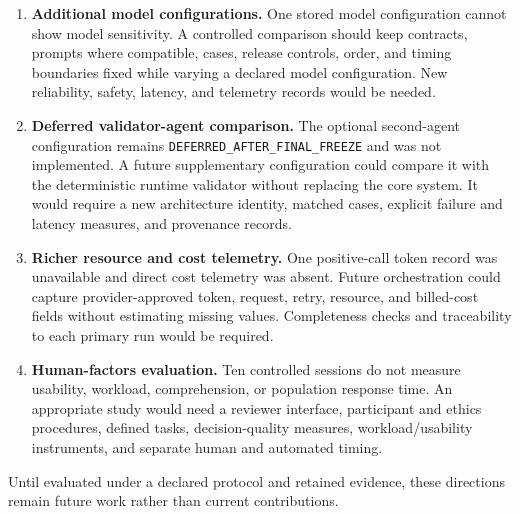 \begin{enumerate}
\item \textbf{Additional model configurations.} One stored model configuration
cannot show model sensitivity. A controlled comparison should keep contracts,
prompts where compatible, cases, release controls, order, and timing boundaries
fixed while varying a declared model configuration. New reliability, safety,
latency, and telemetry records would be needed.

\item \textbf{Deferred validator-agent comparison.} The optional second-agent
configuration remains \texttt{DEFERRED\_AFTER\_FINAL\_FREEZE} and was not
implemented. A future supplementary configuration could compare it with the
deterministic runtime validator without replacing the core system. It would
require a new architecture identity, matched cases, explicit failure and latency
measures, and provenance records.

\item \textbf{Richer resource and cost telemetry.} One positive-call token record
was unavailable and direct cost telemetry was absent. Future orchestration could
capture provider-approved token, request, retry, resource, and billed-cost fields
without estimating missing values. Completeness checks and traceability to each
primary run would be required.

\item \textbf{Human-factors evaluation.} Ten controlled sessions do not measure
usability, workload, comprehension, or population response time. An appropriate
study would need a reviewer interface, participant and ethics procedures,
defined tasks, decision-quality measures, workload/usability instruments, and
separate human and automated timing.
\end{enumerate}

Until evaluated under a declared protocol and retained evidence, these
directions remain future work rather than current contributions.

\setlength{\emergencystretch}{0pt}
